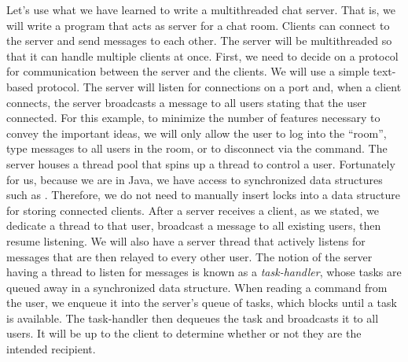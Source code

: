 \example Let's use what we have learned to write a multithreaded chat server. That is, we will write a program that acts as server for a chat room. Clients can connect to the server and send messages to each other. The server will be multithreaded so that it can handle multiple clients at once. First, we need to decide on a protocol for communication between the server and the clients. We will use a simple text-based protocol. The server will listen for connections on a port and, when a client connects, the server broadcasts a message to all users stating that the user connected. For this example, to minimize the number of features necessary to convey the important ideas, we will only allow the user to log into the ``room'', type messages to all users in the room, or to disconnect via the  command. The server houses a thread pool that spins up a thread to control a user. Fortunately for us, because we are in Java, we have access to synchronized data structures such as . Therefore, we do not need to manually insert locks into a data structure for storing connected clients. After a server receives a client, as we stated, we dedicate a thread to that user, broadcast a message to all existing users, then resume listening. We will also have a server thread that actively listens for messages that are then relayed to every other user. The notion of the server having a thread to listen for messages is known as a \textit{task-handler}, whose tasks are queued away in a synchronized  data structure. When reading a command from the user, we enqueue it into the server's queue of tasks, which blocks until a task is available. The task-handler then dequeues the task and broadcasts it to all users. It will be up to the client to determine whether or not they are the intended recipient.

